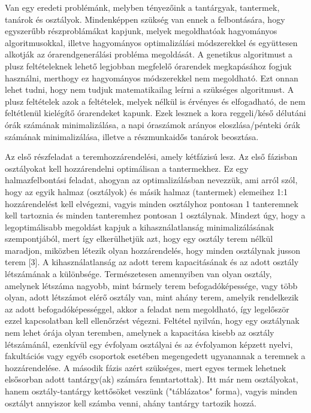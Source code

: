 
Van egy eredeti problémánk, melyben tényezőink a tantárgyak, tantermek, tanárok és 
osztályok. Mindenképpen szükség van ennek a felbontására, hogy egyszerűbb részproblámákat kapjunk, melyek megoldhatóak hagyományos algoritmusokkal, illetve hagyományos optimalizálási módszerekkel és együttesen alkotják az órarendgenerálási probléma megoldását. A genetikus algoritmust a plusz feltételeknek lehető legjobban megfelelő órarendek megkapásához fogjuk használni, merthogy ez hagyományos módszerekkel nem megoldható. Ezt onnan lehet tudni, hogy nem tudjuk matematikailag leírni a szükséges algoritmust. A plusz feltételek azok a feltételek, melyek nélkül is érvényes és elfogadható, de nem feltétlenül kielégítő órarendeket kapunk. Ezek lesznek a kora reggeli/késő délutáni órák számának minimalizálása, a napi óraszámok arányos eloszlása/pénteki órák számának minimalizálása, illetve a részmunkaidős tanárok beosztása.



Az első részfeladat a teremhozzárendelési, amely kétfázisú lesz. Az első fázisban osztályokat kell hozzárendelni optimálisan a tantermekhez. Ez egy halmazfelbontási feladat, ahogyan az optimalizálásban nevezzük, ami arról szól, hogy az egyik halmaz (osztályok) és másik halmaz (tantermek) elemeihez 1:1 hozzárendelést kell elvégezni, vagyis minden osztályhoz pontosan
1 tanteremnek kell tartoznia és minden tanteremhez pontosan 1 osztálynak. Mindezt úgy, hogy a legoptimálisabb megoldást kapjuk a kihasználatlanság minimalizálásának szempontjából, mert így elkerülhetjük azt, hogy egy osztály terem nélkül maradjon, miközben létezik olyan hozzárendelés, hogy minden osztálynak jusson terem [3]. A kihasználatlanság az adott terem kapacitásának és az adott osztály létszámának a különbsége. Természetesen amennyiben van olyan osztály, amelynek létszáma nagyobb, mint bármely terem befogadóképessége, vagy több olyan, adott létszámot elérő osztály van, mint ahány terem, amelyik rendelkezik az adott befogadóképességgel, akkor a feladat nem megoldható, így legelőször ezzel kapcsolatban kell ellenőrzést végezni. Feltétel nyilván, hogy egy osztálynak nem lehet órája olyan teremben, amelynek a kapacitása kisebb az osztály létszámánál, ezenkívül egy évfolyam osztályai és az évfolyamon képzett nyelvi, fakultációs vagy egyéb csoportok esetében megengedett ugyanannak a teremnek a hozzárendelése. A második
fázis azért szükséges, mert egyes termek lehetnek elsősorban adott tantárgy(ak) számára fenntartottak). Itt már nem osztályokat, hanem osztály-tantárgy kettősöket veszünk ("táblázatos" forma), vagyis minden osztályt annyiszor kell számba venni, ahány tantárgy tartozik hozzá. 

